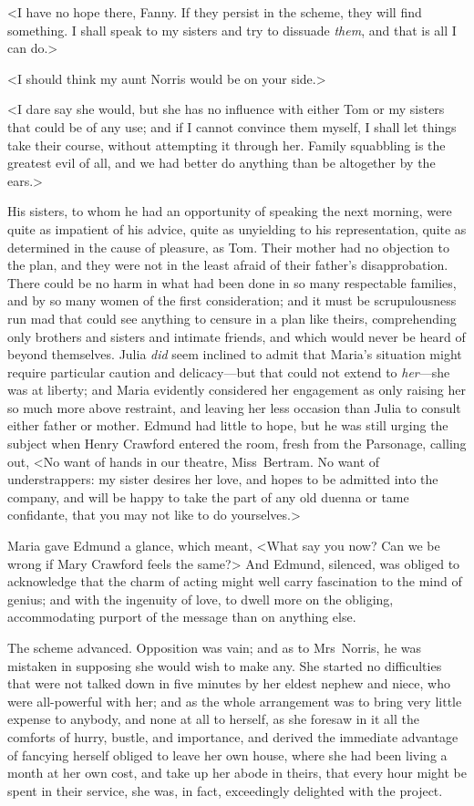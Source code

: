 <I have no hope there, Fanny. If they persist in the scheme, they will find something. I shall speak to my sisters and try to dissuade \textit{them}, and that is all I can do.>

<I should think my aunt Norris would be on your side.>

<I dare say she would, but she has no influence with either Tom or my sisters that could be of any use; and if I cannot convince them myself, I shall let things take their course, without attempting it through her. Family squabbling is the greatest evil of all, and we had better do anything than be altogether by the ears.>

His sisters, to whom he had an opportunity of speaking the next morning, were quite as impatient of his advice, quite as unyielding to his representation, quite as determined in the cause of pleasure, as Tom. Their mother had no objection to the plan, and they were not in the least afraid of their father's disapprobation. There could be no harm in what had been done in so many respectable families, and by so many women of the first consideration; and it must be scrupulousness run mad that could see anything to censure in a plan like theirs, comprehending only brothers and sisters and intimate friends, and which would never be heard of beyond themselves. Julia \textit{did}  seem inclined to admit that Maria's situation might require particular caution and delicacy—but that could not extend to \textit{her}—she was at liberty; and Maria evidently considered her engagement as only raising her so much more above restraint, and leaving her less occasion than Julia to consult either father or mother. Edmund had little to hope, but he was still urging the subject when Henry Crawford entered the room, fresh from the Parsonage, calling out, <No want of hands in our theatre, Miss~Bertram. No want of understrappers: my sister desires her love, and hopes to be admitted into the company, and will be happy to take the part of any old duenna or tame confidante, that you may not like to do yourselves.>

Maria gave Edmund a glance, which meant, <What say you now? Can we be wrong if Mary Crawford feels the same?> And Edmund, silenced, was obliged to acknowledge that the charm of acting might well carry fascination to the mind of genius; and with the ingenuity of love, to dwell more on the obliging, accommodating purport of the message than on anything else.

The scheme advanced. Opposition was vain; and as to Mrs~Norris, he was mistaken in supposing she would wish to make any. She started no difficulties that were not talked down in five minutes by her eldest nephew and niece, who were all-powerful with her; and as the whole arrangement was to bring very little expense to anybody, and none at all to herself, as she foresaw in it all the comforts of hurry, bustle, and importance, and derived the immediate advantage of fancying herself obliged to leave her own house, where she had been living a month at her own cost, and take up her abode in theirs, that every hour might be spent in their service, she was, in fact, exceedingly delighted with the project. 